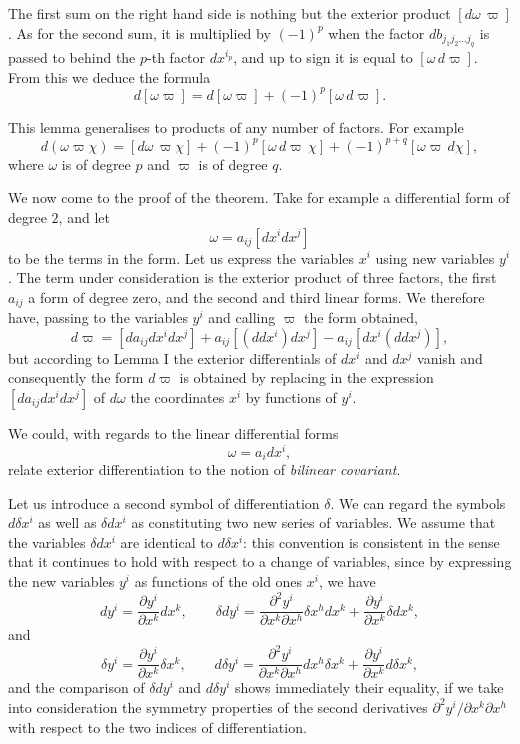 \documentclass[leqno,11pt]{book}
\numberwithin{equation}{chapter}
\newcommand{\pd}{\partial}
\theoremstyle{shape1}
\theoremstyle{shape0}
\theoremstyle{shape2}
\theoremstyle{definition}
\begin{document}
The first sum on the right hand side is nothing but the exterior product $[d\omega\,\varpi]$. As for the second sum, it is multiplied by $(-1)^{p}$ when the factor $db_{j_{1}j_{2}\dots j_{q}}$ is passed to  behind the $p$-th factor $dx^{i_{p}}$, and up to  sign it is equal to $[\omega\,d\varpi]$. From this we deduce the formula
\[
d[\omega\varpi]=d[\omega\varpi]+(-1)^{p}[\omega\, d\varpi].
\]

This lemma generalises to products of any number of factors. For example
\begin{equation}
  \label{eq:2.4}
  d(\omega\varpi\chi)=[d\omega\,\varpi\chi]+(-1)^{p}[\omega \,d\varpi\,\chi]+(-1)^{p+q}[\omega\varpi\, d\chi],
\end{equation}
where $\omega$ is of degree $p$ and $\varpi$ is of degree $q$.

\vspace{12pt}\fsec We now come to the proof of the theorem. Take for example a differential form of degree $2$, and let
\[
\omega=a_{ij}[dx^{i}dx^{j}]
\]
to be the terms in the form. Let us express the variables $x^{i}$ using new variables $y^{i}$. The term under consideration is the exterior product of three factors, the first $a_{ij}$ a form of degree zero, and the second and third linear forms. We therefore have, passing to the variables $y^{i}$ and calling $\varpi$ the form obtained,
\[
d\varpi=[da_{ij}dx^{i}dx^{j}]+a_{ij}[(ddx^{i})dx^{j}]-a_{ij}[dx^{i}(ddx^{j})],
\]
but according to Lemma I the exterior differentials of $dx^{i}$ and $dx^{j}$ vanish and consequently the form $d\varpi$ is obtained by replacing in the expression $[da_{ij}dx^{i}dx^{j}]$ of $d\omega$ the coordinates $x^{i}$ by functions of $y^{i}$.

\vspace{12pt}\fsec We could, with regards to the linear differential forms
\[
\omega=a_{i}dx^{i},
\]
relate exterior differentiation to the notion of \emph{bilinear covariant}.

Let us introduce a second symbol of differentiation $\delta$. We can regard the symbols $d\delta x^{i}$ as well as $\delta d x^{i}$ as constituting two new series of variables.  We  assume that the variables $\delta dx^{i}$ are identical to  $d\delta x^{i}$: this convention is consistent in the sense that it continues to hold with respect to a change of variables, since by expressing the new variables $y^{i}$ as functions of the old ones $x^{i}$, we have
\[
dy^{i}=\frac{\pd y^{i}}{\pd x^{k}}dx^{k},\qquad \delta dy^{i}=\frac{\pd^{2}y^{i}}{\pd x^{k}\pd x^{h}}\delta x^{h}dx^{k}+\frac{\pd y^{i}}{\pd x^{k}}\delta dx^{k},
\]
and
\[
\delta y^{i}=\frac{\pd y^{i}}{\pd x^{k}}\delta x^{k},\qquad d\delta y^{i}=\frac{\pd^{2}y^{i}}{\pd x^{k}\pd x^{h}}d x^{h}\delta x^{k}+\frac{\pd y^{i}}{\pd x^{k}}d\delta x^{k},
\]
and the comparison of $\delta d y^{i}$ and $d\delta y^{i}$ shows immediately their equality, if we take into consideration the symmetry properties of the second derivatives $\pd ^{2}y^{i}/\pd x^{k}\pd x^{h}$ with respect to the two indices of differentiation.
\end{document}
